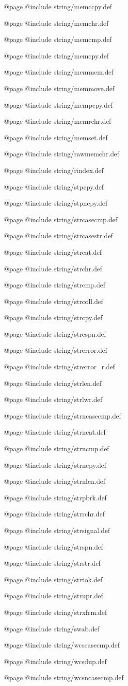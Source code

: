 @page
@include string/memccpy.def

@page
@include string/memchr.def

@page
@include string/memcmp.def

@page
@include string/memcpy.def

@page
@include string/memmem.def

@page
@include string/memmove.def

@page
@include string/mempcpy.def

@page
@include string/memrchr.def

@page
@include string/memset.def

@page
@include string/rawmemchr.def

@page
@include string/rindex.def

@page
@include string/stpcpy.def

@page
@include string/stpncpy.def

@page
@include string/strcasecmp.def

@page
@include string/strcasestr.def

@page
@include string/strcat.def

@page
@include string/strchr.def

@page
@include string/strcmp.def

@page
@include string/strcoll.def

@page
@include string/strcpy.def

@page
@include string/strcspn.def

@page
@include string/strerror.def

@page
@include string/strerror_r.def

@page
@include string/strlen.def

@page
@include string/strlwr.def

@page
@include string/strncasecmp.def

@page
@include string/strncat.def

@page
@include string/strncmp.def

@page
@include string/strncpy.def

@page
@include string/strnlen.def

@page
@include string/strpbrk.def

@page
@include string/strrchr.def

@page
@include string/strsignal.def

@page
@include string/strspn.def

@page
@include string/strstr.def

@page
@include string/strtok.def

@page
@include string/strupr.def

@page
@include string/strxfrm.def

@page
@include string/swab.def

@page
@include string/wcscasecmp.def

@page
@include string/wcsdup.def

@page
@include string/wcsncasecmp.def
